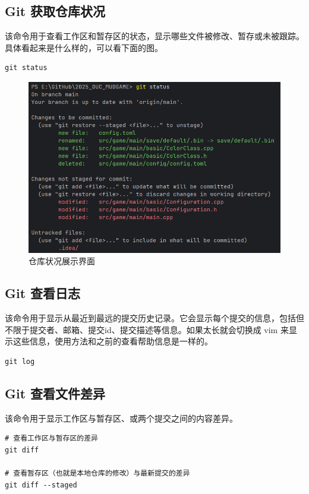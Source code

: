 \documentclass[UTF8]{gyh}
\begin{document}
\subsection{Git 获取仓库状况}
该命令用于查看工作区和暂存区的状态，显示哪些文件被修改、暂存或未被跟踪。具体看起来是什么样的，可以看下面的图。
\begin{lstlisting}
git status
\end{lstlisting}
\begin{figure}[H]
\centering
\includegraphics[scale=0.5]{img/img2.png}
\caption{仓库状况展示界面}
\end{figure}


\subsection{Git 查看日志}
该命令用于显示从最近到最远的提交历史记录。它会显示每个提交的信息，包括但不限于提交者、邮箱、提交id、提交描述等信息。如果太长就会切换成 vim 来显示这些信息，使用方法和之前的查看帮助信息是一样的。
\begin{lstlisting}
git log
\end{lstlisting}

\subsection{Git 查看文件差异}
该命令用于显示工作区与暂存区、或两个提交之间的内容差异。
\begin{lstlisting}
# 查看工作区与暂存区的差异
git diff

# 查看暂存区（也就是本地仓库的修改）与最新提交的差异
git diff --staged
\end{lstlisting}
\end{document}
